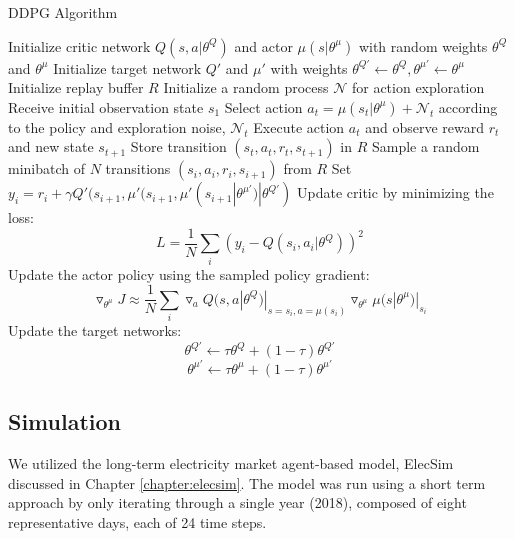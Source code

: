 \begin{algorithm}
	\caption{DDPG Algorithm \cite{Hunt2016a}}
	\begin{algorithmic}[1]
		\small
		\State Initialize critic network $Q(s,a|\theta^Q)$ and actor $\mu(s|\theta^\mu)$ with random weights $\theta^Q$ and $\theta^\mu$
		\State Initialize target network $Q'$ and $\mu'$ with weights $\theta^{Q'}\leftarrow\theta^Q,\theta^{\mu'}\leftarrow \theta^{\mu}$
		\State Initialize replay buffer $R$
		\State Initialize a random process $\mathcal{N}$ for action exploration
		\State Receive initial observation state $s_1$
		\State Select action $a_t=\mu(s_t|\theta^{\mu})+\mathcal{N}_t$ according to the policy and exploration noise, $\mathcal{N}_t$
		\State Execute action $a_t$ and observe reward $r_t$ and new state $s_{t+1}$
		\State Store transition $(s_t, a_t, r_t, s_{t+1})$ in $R$
		\State Sample a random minibatch of $N$ transitions $(s_i, a_i, r_i, s_{i+1})$ from $R$
		\State Set $y_i=r_i+\gamma Q'(s_{i+1},\mu'(s_{i+1},\mu'(s_{i+1}|\theta^{\mu'})|\theta^{Q'})$
		\State Update critic by minimizing the loss: $$L=\frac{1}{N}\sum_i(y_i-Q(s_i,a_i|\theta^Q))^2$$
		\State Update the actor policy using the sampled policy gradient: $$\triangledown_{\theta^\mu}J\approx \frac{1}{N}\sum_i\triangledown_a Q(s,a|\theta^Q)|_{s=s_i,a=\mu(s_i)}\triangledown_{\theta^\mu}\mu(s|\theta^\mu)|_{s_i}$$
		\State Update the target networks:
		$$\theta^{Q'}\leftarrow\tau\theta^Q+(1-\tau)\theta^{Q'}$$
		$$\theta^{\mu'}\leftarrow\tau\theta^\mu+(1-\tau)\theta^{\mu'}$$
		\EndFor
		\EndFor
	\end{algorithmic}
	\label{alg:ddpg}
\end{algorithm}

\subsection{Simulation}

We utilized the long-term electricity market agent-based model, ElecSim \cite{Kell,Kell2020} discussed in Chapter \ref{chapter:elecsim}. The model was run using a short term approach by only iterating through a single year (2018), composed of eight representative days, each of 24 time steps.





